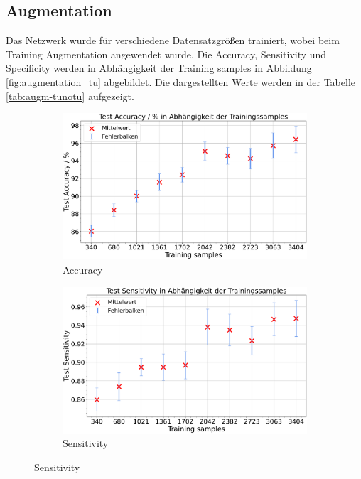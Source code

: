 \subsection{Augmentation}
Das Netzwerk wurde für verschiedene Datensatzgrößen trainiert, wobei beim Training Augmentation angewendet wurde.
Die Accuracy, Sensitivity und Specificity werden in Abhängigkeit der Training samples in Abbildung \ref{fig:augmentation_tu} abgebildet.
Die dargestellten Werte werden in der Tabelle \ref{tab:augm-tunotu} aufgezeigt.
\begin{figure}[H]
  \centering
  \begin{subfigure}[b]{0.48\textwidth}
    \includegraphics[width=\textwidth]{plots/Augm-Messungen-noTu-Tu_Accuracy_mean.pdf}
    \caption{Accuracy}
    \label{fig:augmentation_accuracy}
  \end{subfigure}
  \begin{subfigure}[b]{0.48\textwidth}
    \includegraphics[width=\textwidth]{plots/Augm-Messungen-noTu-Tu_Sensitivity_mean.pdf}
    \caption{Sensitivity}
    \label{fig:augmentation_sensitivity}

\end{subfigure}
\end{figure}
